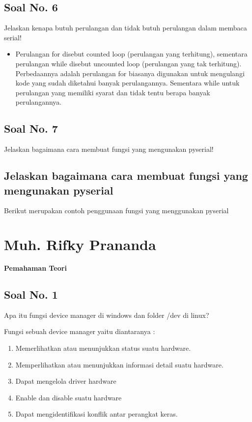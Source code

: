 \subsection{Soal No. 6}
Jelaskan kenapa butuh perulangan dan tidak butuh perulangan dalam membaca serial!
\begin{itemize}
\item Perulangan for disebut counted loop (perulangan yang terhitung), sementara perulangan while disebut uncounted loop (perulangan yang tak terhitung). Perbedaannya adalah perulangan for biasanya digunakan untuk mengulangi kode yang sudah diketahui banyak perulangannya. Sementara while untuk perulangan yang memiliki syarat dan tidak tentu berapa banyak perulangannya.
\end{itemize}
\subsection{Soal No. 7}
Jelaskan bagaimana cara membuat fungsi yang mengunakan pyserial!

\subsection{Jelaskan bagaimana cara membuat fungsi yang mengunakan pyserial}
Berikut merupakan contoh penggunaan fungsi yang menggunakan pyserial



\section{Muh. Rifky Prananda}
{\Large \textbf{Pemahaman Teori}}
\subsection{Soal No. 1}
Apa itu fungsi device manager di windows dan folder /dev di linux?

\hfill \break
Fungsi sebuah device manager yaitu diantaranya :
\begin{enumerate}
	\item Memerlihatkan atau menunjukkan status suatu hardware.
	\item Memperlihatkan atau menunjukkan informasi detail suatu hardware.
	\item Dapat mengelola driver hardware
	\item Enable dan disable suatu hardware
	\item Dapat mengidentifikasi konflik antar perangkat keras.
\end{enumerate}


